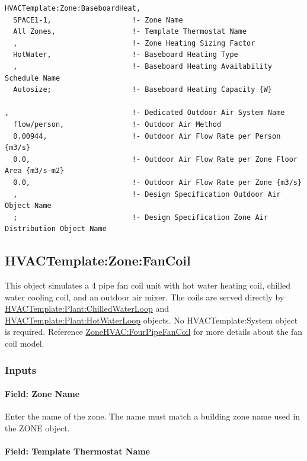\begin{lstlisting}
HVACTemplate:Zone:BaseboardHeat,
  SPACE1-1,                   !- Zone Name
  All Zones,                  !- Template Thermostat Name
  ,                           !- Zone Heating Sizing Factor
  HotWater,                   !- Baseboard Heating Type
  ,                           !- Baseboard Heating Availability Schedule Name
  Autosize;                   !- Baseboard Heating Capacity {W}

,                             !- Dedicated Outdoor Air System Name
  flow/person,                !- Outdoor Air Method
  0.00944,                    !- Outdoor Air Flow Rate per Person {m3/s}
  0.0,                        !- Outdoor Air Flow Rate per Zone Floor Area {m3/s-m2}
  0.0,                        !- Outdoor Air Flow Rate per Zone {m3/s}
  ,                           !- Design Specification Outdoor Air Object Name
  ;                           !- Design Specification Zone Air Distribution Object Name
\end{lstlisting}

\subsection{HVACTemplate:Zone:FanCoil}\label{hvactemplatezonefancoil}

This object simulates a 4 pipe fan coil unit with hot water heating coil, chilled water cooling coil, and an outdoor air mixer. The coils are served directly by \hyperref[hvactemplateplantchilledwaterloop]{HVACTemplate:Plant:ChilledWaterLoop} and \hyperref[hvactemplateplanthotwaterloop]{HVACTemplate:Plant:HotWaterLoop} objects. No HVACTemplate:System object is required. Reference \hyperref[zonehvacfourpipefancoil]{ZoneHVAC:FourPipeFanCoil} for more details about the fan coil model.

\subsubsection{Inputs}\label{inputs-3-018}

\paragraph{Field: Zone Name}\label{field-zone-name-2-002}

Enter the name of the zone. The name must match a building zone name used in the ZONE object.

\paragraph{Field: Template Thermostat Name}\label{field-template-thermostat-name-2}

